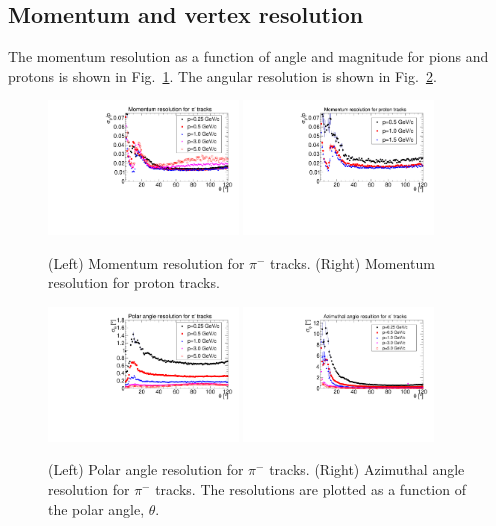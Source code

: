 \subsection{Momentum and vertex resolution}

The momentum resolution as a function of angle and magnitude for pions and 
protons is shown in Fig.~\ref{fig:dp_p}.  The angular resolution is shown in 
Fig.~\ref{fig:angle res}.


\begin{figure}[tbp]
\begin{center}
\includegraphics[width=0.45\textwidth]{figures/PionMomentumResolution.pdf}
\includegraphics[width=0.45\textwidth]{figures/ProtonMomentumResolution.pdf}
\caption{\label{fig:dp_p} (Left) Momentum resolution for $\pi^-$ tracks.
(Right) Momentum resolution for proton tracks.}
\end{center}
\end{figure}

\begin{figure}[tbp]
\begin{center}
\includegraphics[width=0.45\textwidth]{figures/PionThetaResolution.pdf}
\includegraphics[width=0.45\textwidth]{figures/PionPhiResolution.pdf}
\caption{\label{fig:angle res} (Left) Polar angle resolution for $\pi^-$ tracks.
(Right) Azimuthal angle resolution for $\pi^-$ tracks.
The resolutions are plotted as a function of the polar angle, $\theta$.}
\end{center}
\end{figure}

